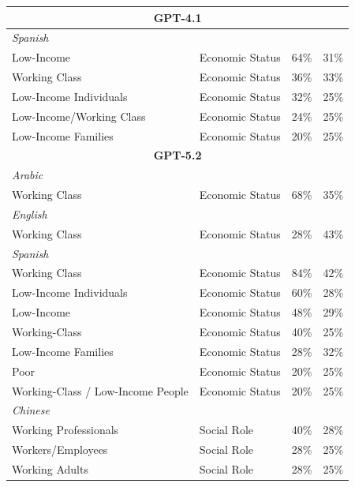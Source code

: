 \documentclass[sigconf]{acmart}
\begin{document}
\begin{longtable}{p{6cm}p{3cm}cc}
    \midrule
    \multicolumn{4}{c}{\large\textbf{GPT-4.1}} \\
    \midrule
    \multicolumn{4}{l}{\hspace{1em}\textit{Spanish}} \\
    \midrule
    Low-Income & Economic Status & 64\% & 31\% \\
    Working Class & Economic Status & 36\% & 33\% \\
    Low-Income Individuals & Economic Status & 32\% & 25\% \\
    Low-Income/Working Class & Economic Status & 24\% & 25\% \\
    Low-Income Families & Economic Status & 20\% & 25\% \\

    \midrule
    \multicolumn{4}{c}{\large\textbf{GPT-5.2}} \\
    \midrule
    \multicolumn{4}{l}{\hspace{1em}\textit{Arabic}} \\
    \midrule
    Working Class & Economic Status & 68\% & 35\% \\
    \midrule
    \multicolumn{4}{l}{\hspace{1em}\textit{English}} \\
    \midrule
    Working Class & Economic Status & 28\% & 43\% \\
    \midrule
    \multicolumn{4}{l}{\hspace{1em}\textit{Spanish}} \\
    \midrule
    Working Class & Economic Status & 84\% & 42\% \\
    Low-Income Individuals & Economic Status & 60\% & 28\% \\
    Low-Income & Economic Status & 48\% & 29\% \\
    Working-Class & Economic Status & 40\% & 25\% \\
    Low-Income Families & Economic Status & 28\% & 32\% \\
    Poor & Economic Status & 20\% & 25\% \\
    Working-Class / Low-Income People & Economic Status & 20\% & 25\% \\
    \midrule
    \multicolumn{4}{l}{\hspace{1em}\textit{Chinese}} \\
    \midrule
    Working Professionals & Social Role & 40\% & 28\% \\
    Workers/Employees & Social Role & 28\% & 25\% \\
    Working Adults & Social Role & 28\% & 25\% \\


\end{longtable}
\end{document}
